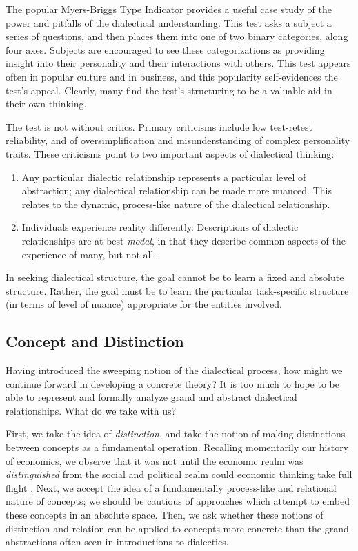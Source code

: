 The popular Myers-Briggs Type Indicator provides a useful case study of the power and pitfalls of the dialectical understanding.
This test asks a subject a series of questions, and then places them into one of two binary categories, along four axes.
Subjects are encouraged to see these categorizations as providing insight into their personality and their interactions with others.
This test appears often in popular culture and in business, and this popularity self-evidences the test's appeal.
Clearly, many find the test's structuring to be a valuable aid in their own thinking.

The test is not without critics.
Primary criticisms include low test-retest reliability, and of oversimplification and misunderstanding of complex personality traits.
These criticisms point to two important aspects of dialectical thinking:

\begin{enumerate}
	\item Any particular dialectic relationship represents a particular level of abstraction; any dialectical relationship can be made more nuanced. This relates to the dynamic, process-like nature of the dialectical relationship.
	\item Individuals experience reality differently. Descriptions of dialectic relationships are at best \textit{modal}, in that they describe common aspects of the experience of many, but not all.
\end{enumerate}

In seeking dialectical structure, the goal cannot be to learn a fixed and absolute structure. Rather, the goal must be to learn the particular task-specific structure (in terms of level of nuance) appropriate for the entities involved.


\subsection{Concept and Distinction}

Having introduced the sweeping notion of the dialectical process, how might we continue forward in developing a concrete theory?
It is too much to hope to be able to represent and formally analyze grand and abstract dialectical relationships.
What do we take with us?

First, we take the idea of \textit{distinction}, and take the notion of making distinctions between concepts as a fundamental operation.
Recalling momentarily our history of economics, we observe that it was not until the economic realm was \textit{distinguished} from the social and political realm could economic thinking take full flight \cite{heilbroner}.
Next, we accept the idea of a fundamentally process-like and relational nature of concepts; we should be cautious of approaches which attempt to embed these concepts in an absolute space.
Then, we ask whether these notions of distinction and relation can be applied to concepts more concrete than the grand abstractions often seen in introductions to dialectics.


